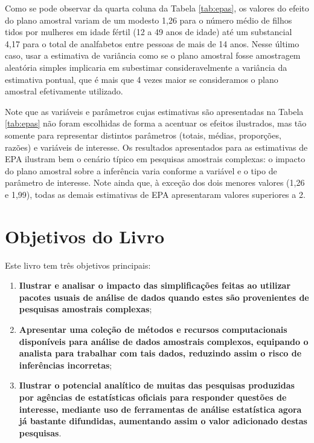 \documentclass[]{book}
\theoremstyle{definition}
\theoremstyle{definition}
\theoremstyle{definition}
\theoremstyle{remark}
\begin{document}
Como se pode observar da quarta coluna da Tabela \ref{tab:epas}, os
valores do efeito do plano amostral variam de um modesto 1,26 para o
número médio de filhos tidos por mulheres em idade fértil (12 a 49 anos
de idade) até um substancial 4,17 para o total de analfabetos entre
pessoas de mais de 14 anos. Nesse último caso, usar a estimativa de
variância como se o plano amostral fosse amostragem aleatória simples
implicaria em subestimar consideravelmente a variância da estimativa
pontual, que é mais que 4 vezes maior se consideramos o plano amostral
efetivamente utilizado.

Note que as variáveis e parâmetros cujas estimativas são apresentadas na
Tabela \ref{tab:epas} não foram escolhidas de forma a acentuar os
efeitos ilustrados, mas tão somente para representar distintos
parâmetros (totais, médias, proporções, razões) e variáveis de
interesse. Os resultados apresentados para as estimativas de EPA
ilustram bem o cenário típico em pesquisas amostrais complexas: o
impacto do plano amostral sobre a inferência varia conforme a variável e
o tipo de parâmetro de interesse. Note ainda que, à exceção dos dois
menores valores (1,26 e 1,99), todas as demais estimativas de EPA
apresentaram valores superiores a 2.

\section{Objetivos do Livro}\label{objetivos-do-livro}

Este livro tem três objetivos principais:

\begin{enumerate}
\def\labelenumi{\arabic{enumi})}
\item
  \textbf{Ilustrar e analisar o impacto das simplificações feitas ao
  utilizar pacotes usuais de análise de dados quando estes são
  provenientes de pesquisas amostrais complexas};
\item
  \textbf{Apresentar uma coleção de métodos e recursos computacionais
  disponíveis para análise de dados amostrais complexos, equipando o
  analista para trabalhar com tais dados, reduzindo assim o risco de
  inferências incorretas};
\item
  \textbf{Ilustrar o potencial analítico de muitas das pesquisas
  produzidas por agências de estatísticas oficiais para responder
  questões de interesse, mediante uso de ferramentas de análise
  estatística agora já bastante difundidas, aumentando assim o valor
  adicionado destas pesquisas}.
\end{enumerate}
\end{document}
